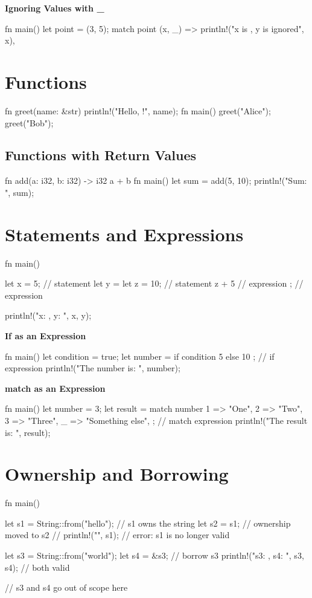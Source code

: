 \documentclass[8pt,a4paper,twocolumn]{extarticle}
\begin{document}
\textbf{Ignoring Values with \_}
\begin{Code}
fn main() {
    let point = (3, 5);
    match point {
        (x, _) => println!("x is {}, y is ignored", x),
    }
}
\end{Code}

\section{Functions}
\begin{Code}
    fn greet(name: &str) {
        println!("Hello, {}!", name);
    }
    fn main() {
        greet("Alice");
        greet("Bob");
    } 
\end{Code}  
\subsection{Functions with Return Values}
\begin{Code}
    fn add(a: i32, b: i32) -> i32 {
        a + b
    }
    fn main() {
        let sum = add(5, 10);
        println!("Sum: {}", sum);
    }
\end{Code}

\section{Statements and Expressions}
\begin{Code}
fn main() {
    let x = 5; // statement
    let y = {
        let z = 10; // statement
        z + 5      // expression
    }; // expression

    println!("x: {}, y: {}", x, y);
}
\end{Code}

\textbf{If as an Expression}
\begin{Code}
fn main() {
    let condition = true;
    let number = if condition { 5 } else { 10 }; // if expression
    println!("The number is: {}", number);
}
\end{Code}

\textbf{match as an Expression}
\begin{Code}
fn main() {
    let number = 3;
    let result = match number {
        1 => "One",
        2 => "Two",
        3 => "Three",
        _ => "Something else",
    }; // match expression
    println!("The result is: {}", result);
}
\end{Code}


\section{Ownership and Borrowing}
\begin{Code}
fn main() {
    let s1 = String::from("hello"); // s1 owns the string
    let s2 = s1;                    // ownership moved to s2
    // println!("{}", s1);          // error: s1 is no longer valid

    let s3 = String::from("world");
    let s4 = &s3;                   // borrow s3
    println!("s3: {}, s4: {}", s3, s4); // both valid
}// s3 and s4 go out of scope here
\end{Code}
\end{document}

